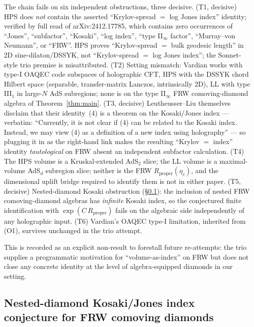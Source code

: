 \documentclass[11pt]{article}
\theoremstyle{definition}
\begin{document}
The chain fails on six independent obstructions, three decisive. (T1, decisive) HPS does \emph{not} contain the asserted ``Krylov-spread $=$ log Jones index'' identity; verified by full read of arXiv:2412.17785, which contains zero occurrences of ``Jones'', ``subfactor'', ``Kosaki'', ``log index'', ``type II$_\infty$ factor'', ``Murray--von Neumann'', or ``FRW''. HPS proves ``Krylov-spread $=$ bulk geodesic length'' in 2D sine-dilaton/DSSYK, not ``Krylov-spread $=$ log Jones index''; the Sonnet-style trio premise is misattributed. (T2) Setting mismatch: Vardian works with type-I OAQEC code subspaces of holographic CFT, HPS with the DSSYK chord Hilbert space (separable, transfer-matrix Lanczos, intrinsically 2D), LL with type III$_1$ in large-$N$ AdS subregions; none is on the type II$_\infty$ FRW comoving-diamond algebra of Theorem~\ref{thm:main}. (T3, decisive) Leutheusser--Liu themselves disclaim that their identity~(4) is a theorem on the Kosaki/Jones index --- verbatim: ``Currently, it is not clear if (4) can be related to the Kosaki index. Instead, we may view (4) as a definition of a new index using holography'' --- so plugging it in as the right-hand link makes the resulting ``Krylov $=$ index'' identity \emph{tautological} on FRW absent an independent subfactor calculation. (T4) The HPS volume is a Kruskal-extended AdS$_2$ slice; the LL volume is a maximal-volume AdS$_d$ subregion slice; neither is the FRW $R_{\mathrm{proper}}(\eta_c)$, and the dimensional uplift bridge required to identify them is not in either paper. (T5, decisive) Nested-diamond Kosaki obstruction (\S\ref{ssec:fal-nested}): the inclusion of nested FRW comoving-diamond algebras has \emph{infinite} Kosaki index, so the conjectured finite identification with $\exp(C\,R_{\mathrm{proper}})$ fails on the algebraic side independently of any holographic input. (T6) Vardian's OAQEC type-I limitation, inherited from (O1), survives unchanged in the trio attempt.

This is recorded as an explicit non-result to forestall future re-attempts: the trio supplies a programmatic motivation for ``volume-as-index'' on FRW but does not close any concrete identity at the level of algebra-equipped diamonds in our setting.

\subsection{Nested-diamond Kosaki/Jones index conjecture for FRW comoving diamonds}\label{ssec:fal-nested}
\end{document}
